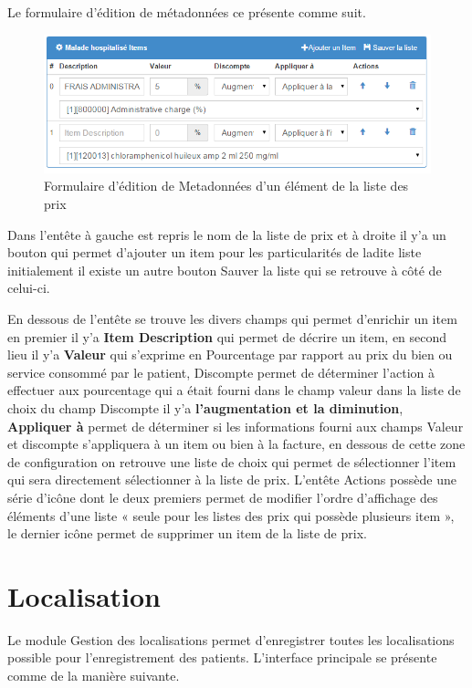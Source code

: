 \documentclass[12pt,a4paper]{report}
\begin{document}
Le formulaire d'édition de métadonnées ce présente comme suit.

\begin{figure}[h]
\begin{center}
\includegraphics[width=14cm]{pic/EditionMetaDonneListeP.png}
\end{center}
\caption{Formulaire d'édition de Metadonnées d'un élément de la liste des prix}
\label{Formulaire permettant de mettre à jour un élément de la liste de prix}
\end{figure}

Dans l'entête à gauche est repris le nom de la liste de prix et à droite il y'a un bouton qui permet d'ajouter un item pour les particularités de ladite liste initialement il existe un autre bouton Sauver la liste qui se retrouve à côté de celui-ci.

En dessous de l'entête se trouve les divers champs qui permet d'enrichir un item en premier il y'a \textbf{Item Description} qui permet de décrire un item, en second lieu il y'a \textbf{Valeur} qui s'exprime en Pourcentage par rapport au prix du bien ou service consommé par le patient, Discompte permet de déterminer l'action à effectuer aux pourcentage qui a était fourni dans le champ valeur dans la liste de choix du champ Discompte il y'a \textbf{l'augmentation et la diminution}, \textbf{Appliquer à} permet de déterminer si les informations fourni   aux champs Valeur et discompte s'appliquera à un item ou bien à la facture, en dessous de cette zone de configuration on retrouve une liste de choix qui permet de sélectionner l'item qui sera directement sélectionner à la liste de prix. L'entête Actions possède une série d'icône dont le deux premiers permet de modifier l'ordre d'affichage des éléments d'une liste « seule pour les listes des prix qui possède plusieurs item », le dernier icône permet de supprimer un item de la liste de prix.

\newpage
\section{Localisation}
Le module Gestion des localisations permet d'enregistrer toutes les localisations possible pour l'enregistrement des patients. L'interface principale se présente comme de la manière suivante.
\end{document}
